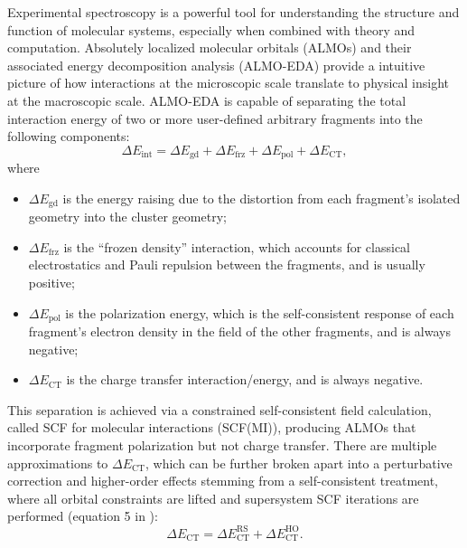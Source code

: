 \documentclass[%
  class = book,%
  crop = false,%
  float = true,%
  multi = true,%
  preview = false,%
]{standalone}
\let\cite\autocite
\begin{document}
Experimental spectroscopy is a powerful tool for understanding the structure and function of molecular systems, especially when combined with theory and computation\cite{AUTSCHBACH200383,NEESE2009526,doi:10.1021/cr2002239}. Absolutely localized molecular orbitals (ALMOs)\cite{Khaliullin2006} and their associated energy decomposition analysis (ALMO-EDA)\cite{Khaliullin2007} provide a intuitive picture of how interactions at the microscopic scale translate to physical insight at the macroscopic scale. ALMO-EDA is capable of separating the total interaction energy of two or more user-defined arbitrary fragments into the following components:
\begin{equation}
  \label{eq:almo-eda}
  \Delta E_{\text{int}} = \Delta E_{\text{gd}} + \Delta E_{\text{frz}} + \Delta E_{\text{pol}} + \Delta E_{\text{CT}},
\end{equation}
where
\begin{itemize}
\item \(\Delta E_{\text{gd}}\) is the energy raising due to the distortion from each fragment's isolated geometry into the cluster geometry;
\item \(\Delta E_{\text{frz}}\) is the ``frozen density'' interaction, which accounts for classical electrostatics and Pauli repulsion between the fragments, and is usually positive;
\item \(\Delta E_{\text{pol}}\) is the polarization energy, which is the self-consistent response of each fragment's electron density in the field of the other fragments, and is always negative;
\item \(\Delta E_{\text{CT}}\) is the charge transfer interaction/energy, and is always negative.
\end{itemize}

This separation is achieved via a constrained self-consistent field calculation, called SCF for molecular interactions (SCF(MI)), producing ALMOs that incorporate fragment polarization but not charge transfer. There are multiple approximations to \(\Delta E_{\text{CT}}\), which can be further broken apart into a perturbative correction and higher-order effects stemming from a self-consistent treatment, where all orbital constraints are lifted and supersystem SCF iterations are performed (equation 5 in ):
\begin{equation}
  \label{eq:almo-eda-ct}
  \Delta E_{\text{CT}} = \Delta E_{\text{CT}}^{\text{RS}} + \Delta E_{\text{CT}}^{\text{HO}}.
\end{equation}
\end{document}
